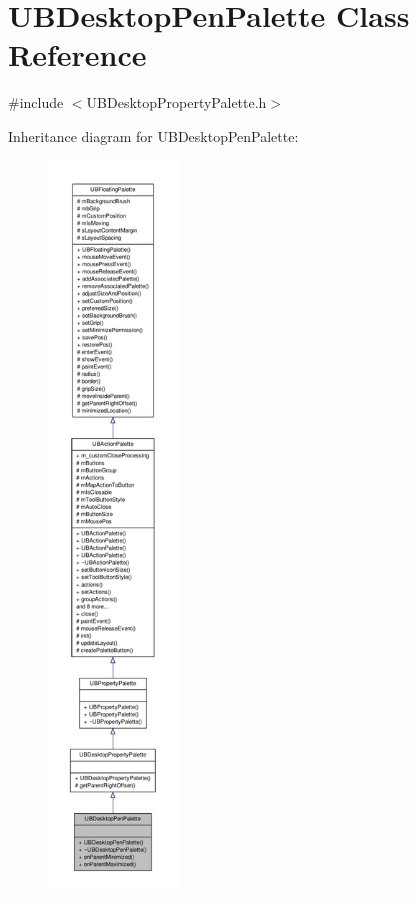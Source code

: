 \hypertarget{class_u_b_desktop_pen_palette}{\section{U\-B\-Desktop\-Pen\-Palette Class Reference}
\label{de/dd8/class_u_b_desktop_pen_palette}
}


{\ttfamily \#include $<$U\-B\-Desktop\-Property\-Palette.\-h$>$}



Inheritance diagram for U\-B\-Desktop\-Pen\-Palette\-:
\nopagebreak
\begin{figure}[H]
\begin{center}
\leavevmode
\includegraphics[height=550pt]{d5/de0/class_u_b_desktop_pen_palette__inherit__graph}
\end{center}
\end{figure}


